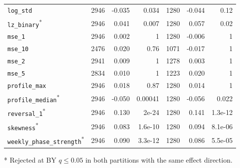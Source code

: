 \begin{longtable}{p{}rrrrrr}
\raggedright \nolinkurl{log_std} & 2946 & -0.035 & 0.034 & 1280 & -0.044 & 0.12 \\
\raggedright \nolinkurl{lz_binary}\textsuperscript{*} & 2946 & 0.041 & 0.007 & 1280 & 0.057 & 0.02 \\
\raggedright \nolinkurl{mse_1} & 2946 & 0.002 & 1 & 1280 & -0.006 & 1 \\
\raggedright \nolinkurl{mse_10} & 2476 & 0.020 & 0.76 & 1071 & -0.017 & 1 \\
\raggedright \nolinkurl{mse_2} & 2941 & 0.009 & 1 & 1278 & 0.003 & 1 \\
\raggedright \nolinkurl{mse_5} & 2834 & 0.010 & 1 & 1223 & 0.020 & 1 \\
\raggedright \nolinkurl{profile_max} & 2946 & 0.018 & 0.87 & 1280 & 0.014 & 1 \\
\raggedright \nolinkurl{profile_median}\textsuperscript{*} & 2946 & -0.050 & 0.00041 & 1280 & -0.056 & 0.022 \\
\raggedright \nolinkurl{reversal_1}\textsuperscript{*} & 2946 & 0.130 & 2e-24 & 1280 & 0.141 & 1.3e-12 \\
\raggedright \nolinkurl{skewness}\textsuperscript{*} & 2946 & 0.083 & 1.6e-10 & 1280 & 0.094 & 8.1e-06 \\
\raggedright \nolinkurl{weekly_phase_strength}\textsuperscript{*} & 2946 & 0.090 & 3.3e-12 & 1280 & 0.086 & 5.5e-05 \\
\bottomrule\end{longtable}
* Rejected at BY $q\leq0.05$ in both partitions with the same effect direction.\endgroup

